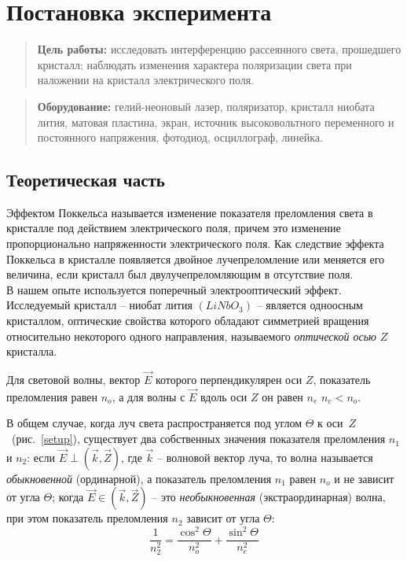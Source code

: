 \documentclass{lab}
\begin{document}

\section*{Постановка эксперимента}

\begin{quote}
	\textbf{{\normalsize Цель работы: }}
	исследовать интерференцию рассеянного света, прошедшего кристалл; наблюдать изменения 
	характера поляризации света при наложении на кристалл электрического поля.
\end{quote}

\begin{quote}
	\textbf{{\normalsize Оборудование: }}
	гелий-неоновый лазер, поляризатор, кристалл ниобата лития, матовая пластина, экран, 
	источник высоковольтного переменного и постоянного напряжения, фотодиод, осциллограф, 
	линейка.
\end{quote}

\subsection*{Теоретическая часть}

Эффектом Поккельса называется изменение показателя преломления света в кристалле под действием 
электрического поля, причем это изменение пропорционально напряженности электрического поля. 
Как следствие эффекта Поккельса в кристалле появляется двойное лучепреломление или меняется 
его величина, если кристалл был двулучепреломляющим в отсутствие поля.\\

В нашем опыте используется поперечный электрооптический эффект. Исследуемый кристалл -- ниобат 
лития $ (LiNbO_3) $ -- является одноосным кристаллом, оптические свойства которого обладают 
симметрией вращения относительно некоторого одного направления, называемого \textit{оптической 
осью} $ Z $ кристалла.

Для световой волны, вектор $ \vec{E} $ которого перпендикулярен оси $ Z $, показатель 
преломления равен $ n_o $, а для волны с $ \vec{E} $ вдоль оси $ Z $ он равен $ n_e $ $ n_e < 
n_o $.

В общем случае, когда луч света распространяется под углом $ \Theta $ к оси~$ Z 
$~(рис.~\ref{setup}), существует два собственных значения показателя преломления $ n_1 $ и $ 
n_2 $: если $ \vec{E} \perp (\vec{k}, \vec{Z})$, где $ \vec{k} $ -- волновой вектор луча, то 
волна называется \textit{обыкновенной} (ординарной), а показатель преломления $ n_1 $ равен $ 
n_o $ и не зависит от угла $ \Theta $; когда $ \vec{E} \in (\vec{k}, \vec{Z}) $ -- это 
\textit{необыкновенная} (экстраординарная) волна, при этом показатель преломления $ n_2 $ 
зависит от угла $ \Theta $:
$$ \frac{1}{n_2^2} = \frac{\cos^2\Theta}{n_o^2} + \frac{\sin^2\Theta}{n_e^2} $$
\end{document}
